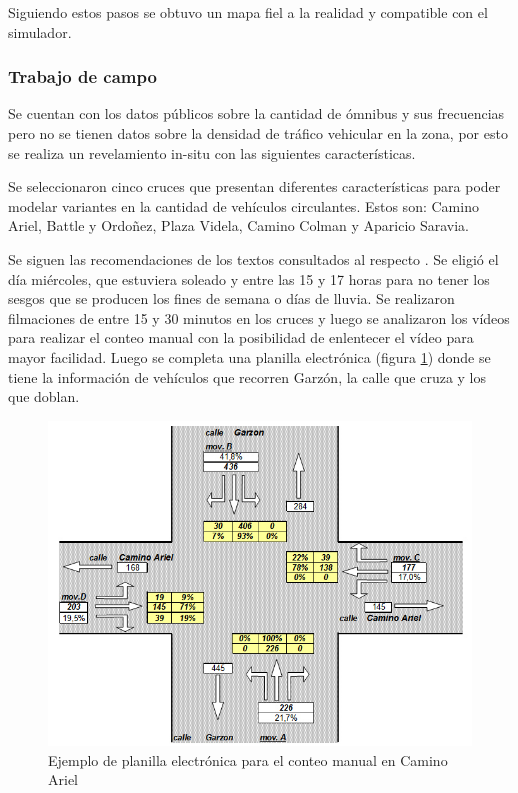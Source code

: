 Siguiendo estos pasos se obtuvo un mapa fiel a la realidad y compatible con el simulador.


\subsubsection{Trabajo de campo}
Se cuentan con los datos públicos sobre la cantidad de  ómnibus y sus frecuencias pero no se tienen datos sobre la densidad de tráfico vehicular en la zona, por esto se realiza un revelamiento in-situ con las siguientes características.

Se seleccionaron cinco cruces que presentan diferentes características para poder modelar variantes en la cantidad de vehículos circulantes.
Estos son: Camino Ariel, Battle y Ordoñez, Plaza Videla, Camino Colman y Aparicio Saravia. 

Se siguen las recomendaciones de los textos consultados al respecto \citep{ConteoTrafico}. Se eligió el día miércoles, que estuviera soleado y entre las 15 y 17 horas para no tener los sesgos que se producen los fines de semana o días de lluvia.
Se realizaron filmaciones de entre 15 y 30 minutos en los cruces y luego se analizaron los vídeos para realizar el conteo manual con la posibilidad de enlentecer el vídeo para mayor facilidad. Luego se completa una planilla electrónica (figura \ref{fig:conteo_hoja}) donde se tiene la información de vehículos que recorren Garzón, la calle que cruza y los que doblan. 

\begin{figure}[H]
	\centering
	\includegraphics[width=0.9\linewidth]{Figures/conteo_hoja}
	\caption{Ejemplo de planilla electrónica para el conteo manual en Camino Ariel}
	\label{fig:conteo_hoja}
\end{figure}



